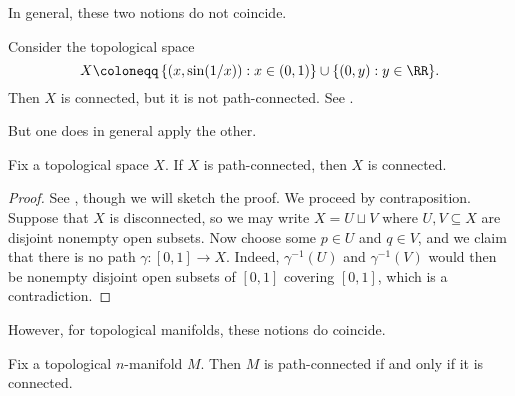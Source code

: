 \documentclass[../notes.tex]{subfiles}
\begin{document}
In general, these two notions do not coincide.
\begin{example}
	Consider the topological space
	\[X\coloneqq\left\{(x,\sin(1/x)):x\in(0,1)\right\}\cup\{(0,y):y\in\RR\}.\]
	Then $X$ is connected, but it is not path-connected. See \cite[Exercise~A.20]{elber-top}.
\end{example}
But one does in general apply the other.
\begin{lemma} \label{lem:path-connected-to-connected}
	Fix a topological space $X$. If $X$ is path-connected, then $X$ is connected.
\end{lemma}
\begin{proof}
	See \cite[Lemma~A.16]{elber-top}, though we will sketch the proof. We proceed by contraposition. Suppose that $X$ is disconnected, so we may write $X=U\sqcup V$ where $U,V\subseteq X$ are disjoint nonempty open subsets. Now choose some $p\in U$ and $q\in V$, and we claim that there is no path $\gamma\colon[0,1]\to X$. Indeed, $\gamma^{-1}(U)$ and $\gamma^{-1}(V)$ would then be nonempty disjoint open subsets of $[0,1]$ covering $[0,1]$, which is a contradiction.
\end{proof}
However, for topological manifolds, these notions do coincide.
\begin{proposition}
	Fix a topological $n$-manifold $M$. Then $M$ is path-connected if and only if it is connected.
\end{proposition}
\end{document}
